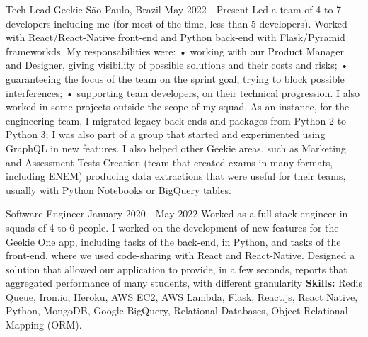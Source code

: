 \documentclass[11pt, a4paper]{awesome-cv-res}
\begin{document}
\makecvheader
\makecvfooter
{}
{}
{\thepage}

\begin{cventries}
\cventry
{Tech Lead}
{Geekie}
{São Paulo, Brazil}
{May 2022 - Present}
{
    Led a team of 4 to 7 developers including me (for most of the time, less
    than 5 developers). Worked with React/React-Native front-end and
    Python back-end with Flask/Pyramid frameworkds.
    My responsabilities were:
    \newline \hspace{1em} • working with our Product Manager and 
    Designer, giving visibility of possible solutions and their costs 
    and risks;
    \newline \hspace{1em} • guaranteeing the focus of the team on the sprint goal, trying to
    block possible interferences;
    \newline \hspace{1em} • supporting team developers, on their technical progression.
    \newline I also worked in some projects outside the scope of my squad. 
    As an instance, for the engineering team, I migrated legacy 
    back-ends and packages from Python 2 to Python 3; I was also 
    part of a group that started and experimented using GraphQL in new 
    features. 
    I also helped other Geekie areas, such as Marketing and Assessment 
    Tests Creation (team that created exams in many formats, including
    ENEM) producing data extractions that were useful for their teams, 
    usually with Python Notebooks or BigQuery tables.
}    
    
\cventry
{Software Engineer}
{}
{}
{January 2020 - May 2022}
{Worked as a full stack engineer in squads of 4 to 6 people. I worked on
the development of new features for the Geekie One app, including tasks 
of the back-end, in Python, and tasks of the front-end, where we used 
code-sharing with React and React-Native. Designed a solution that 
allowed our application to provide, in a few seconds, reports that
aggregated performance of many students, with different granularity
\newline\textbf{Skills:}  Redis Queue, Iron.io, Heroku, AWS EC2, AWS
    Lambda, Flask, React.js, React Native, Python, MongoDB, Google 
    BigQuery, Relational Databases, Object-Relational Mapping (ORM).
}


\end{cventries}
\end{document}
